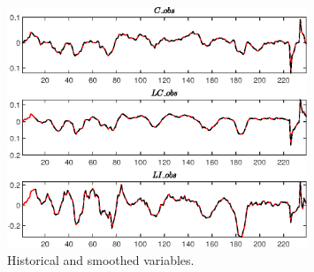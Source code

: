  
\begin{figure}[H]
\centering 
\includegraphics[width=0.80\textwidth]{two_sector_RBC_mobile/graphs/two_sector_RBC_mobile_HistoricalAndSmoothedVariables1}
\caption{Historical and smoothed variables.}\label{Fig:HistoricalAndSmoothedVariables:1}
\end{figure}


